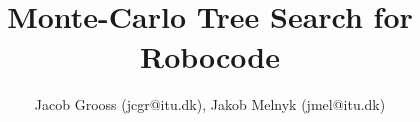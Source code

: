 \documentclass[conference]{IEEEtran}
\begin{document}
\title{\ \\ \LARGE\bf Monte-Carlo Tree Search for Robocode}

\author{Jacob Grooss (jcgr@itu.dk), Jakob Melnyk (jmel@itu.dk)}


\maketitle















%



\end{document}

